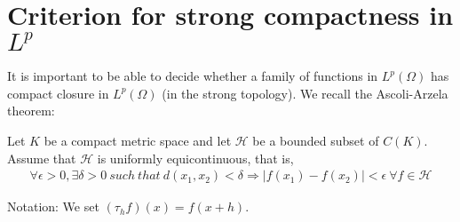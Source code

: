 \documentclass[a4paper]{book}
\begin{document}
  \section{Criterion for strong compactness in $L^p$}
    It is important to be able to decide whether a family of functions in $L^p(\Omega)$ has compact closure in $L^p(\Omega)$ (in the strong topology). We recall the Ascoli-Arzela theorem:
    \begin{thm}
        Let $K$ be a compact metric space and let $\mathcal{H}$ be a bounded subset of $C(K)$. Assume that $\mathcal{H}$ is uniformly equicontinuous, that is,
        \begin{align}
            \forall \epsilon > 0, \exists \delta > 0 \ such \ that \ d(x_1,x_2)<\delta \Rightarrow |f(x_1)-f(x_2)|<\epsilon \ \forall f \in  \mathcal{H}
        \end{align}
    \end{thm}
    Notation: We set $(\tau_hf)(x)=f(x+h)$.
\end{document}

